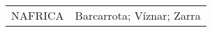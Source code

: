 \documentclass[journal abbreviation, manuscript]{copernicus}
\begin{document}
\begin{table}
\begin{tabularx}{\textwidth}{lX}
  NAFRICA  & Barcarrota; Víznar; Zarra                                                                                                                                                                                                                                                                                                                                                                                                                                                                                                                                                                                                                                                                                                                                                                                                                                                                                                                                                                                                                                                                                                                                                                                                                                                                                                                                                                                                                                                                                                                                                                                                                                                                                                                                                                                                                                                                                                                                                                                                                                                                                                                                                                                                                                                                                                                                                                                                                                                                                                                                                                                                                                                                                                                                                                                                                                                                                                                                                                                                                                                                                                                                                                                                                                                                                                                                                                                   
\end{tabularx}
\end{table}
\end{document}
